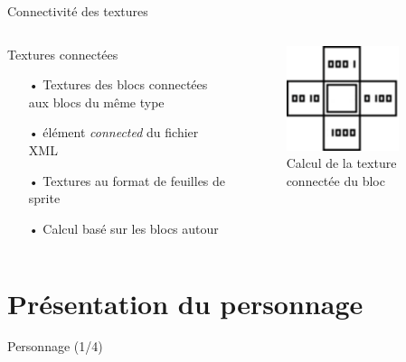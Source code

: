 \documentclass{beamer}
\begin{document}
{\begin{frame}{Connectivité des textures}
    \begin{columns}
            \begin{block}{Textures connectées}
                \begin{itemize}
                    \item[•] Textures des blocs connectées aux blocs du même type
                    \item[•] élément \emph{connected} du fichier XML
                    \item[•] Textures au format de feuilles de sprite
                    \item[•] Calcul basé sur les blocs autour
                \end{itemize}
            \end{block}
            \begin{figure}
                \centering
                \includegraphics[width=0.8\textwidth]{images/connected_textures_offset_computing.png}
                \caption{Calcul de la texture connectée du bloc}
            \end{figure}
    \end{columns}
\end{frame}

\section{Présentation du personnage}
\begin{frame}{Personnage (1/4)}


\end{frame}}
\end{document}
